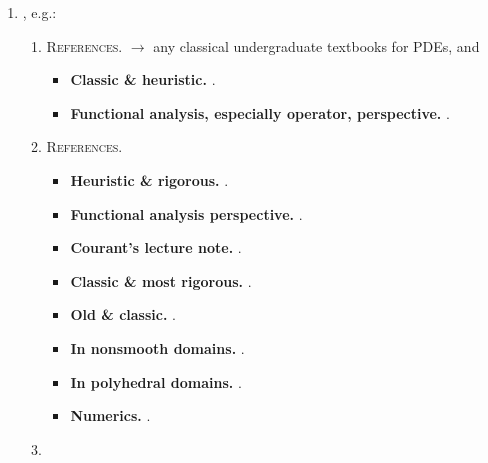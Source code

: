 \documentclass{book}
\numberwithin{equation}{section}
\begin{document}
\begin{enumerate}
    \item {}, e.g.:
    \begin{enumerate}
        \item {}
        
        \textsc{References.} $\to$ any classical undergraduate textbooks for PDEs, and
        \begin{itemize}
            \item \textbf{Classic \& heuristic.} \cite[Chap. 3: Nonlinear 1st-Order PDE]{Evans2010}.
            \item \textbf{Functional analysis, especially operator, perspective.} \cite{Brezis2011}.
        \end{itemize}
        \item {}
        
        \textsc{References.}
        \begin{itemize}
            \item \textbf{Heuristic \& rigorous.} \cite[Chap. 6: 2nd-Order Elliptic Equations]{Evans2010}.
            \item \textbf{Functional analysis perspective.} \cite[Chap. 9: Sobolev Spaces \& the Variational Formulation of Elliptic BVPs in $N$ Dimensions]{Brezis2011}.
            \item \textbf{Courant's lecture note.} \cite{Han_Lin2011}.
            \item \textbf{Classic \& most rigorous.} \cite{Gilbarg_Trudinger2001}.
            \item \textbf{Old \& classic.} \cite{Ladyzhenskaya_Uraltseva1968}.
            \item \textbf{In nonsmooth domains.} \cite{Grisvard1985}.
            \item \textbf{In polyhedral domains.} \cite{Mazya_Rossmann2010}.
            \item \textbf{Numerics.} \cite{Knabner_Angermann2003}.
        \end{itemize}
        \item {}
        

\end{enumerate}
\end{enumerate}
\end{document}
